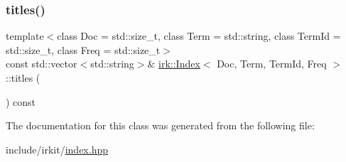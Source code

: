 \mbox{\label{classirk_1_1Index_afb307eea8951d7915c19e411ef31ba65}} 
\subsubsection{\texorpdfstring{titles()}{titles()}}
{\footnotesize\ttfamily template$<$class Doc  = std\+::size\+\_\+t, class Term  = std\+::string, class Term\+Id  = std\+::size\+\_\+t, class Freq  = std\+::size\+\_\+t$>$ \\
const std\+::vector$<$std\+::string$>$\& \mbox{\hyperlink{classirk_1_1Index}{irk\+::\+Index}}$<$ Doc, Term, Term\+Id, Freq $>$\+::titles (\begin{DoxyParamCaption}{ }\end{DoxyParamCaption}) const\hspace{0.3cm}{\ttfamily [inline]}}



The documentation for this class was generated from the following file\+:\begin{DoxyCompactItemize}
\item 
include/irkit/\mbox{\hyperlink{irkit_2index_8hpp}{index.\+hpp}}\end{DoxyCompactItemize}
